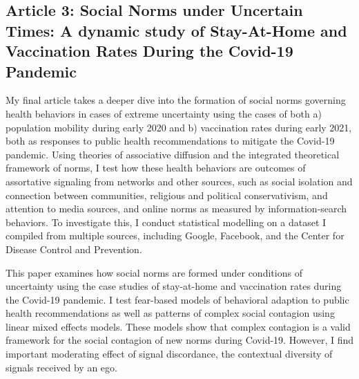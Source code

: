 \subsection{Article 3: Social Norms under Uncertain Times: A dynamic study of Stay-At-Home and Vaccination Rates During the Covid-19 Pandemic}
My final article takes a deeper dive into the formation of social norms
governing health behaviors in cases of extreme uncertainty using the
cases of both a) population mobility during early 2020 and b)
vaccination rates during early 2021, both as responses to public health
recommendations to mitigate the Covid-19 pandemic. Using theories of
associative diffusion and the integrated theoretical framework of norms,
I test how these health behaviors are outcomes of assortative signaling
from networks and other sources, such as social isolation and connection
between communities, religious and political conservativism, and
attention to media sources, and online norms as measured by
information-search behaviors. To investigate this, I conduct statistical
modelling on a dataset I compiled from multiple sources, including
Google, Facebook, and the Center for Disease Control and Prevention.

This paper examines how social norms are formed under conditions of uncertainty
using the case studies of stay-at-home and vaccination rates during the Covid-19
pandemic.  I test fear-based models of behavioral adaption to public health
recommendations as well as patterns of complex social contagion using linear
mixed effects models. These models show that complex contagion is a valid
framework for the social contagion of new norms during Covid-19. However, I find
important moderating effect of signal discordance, the contextual diversity of
signals received by an ego.
